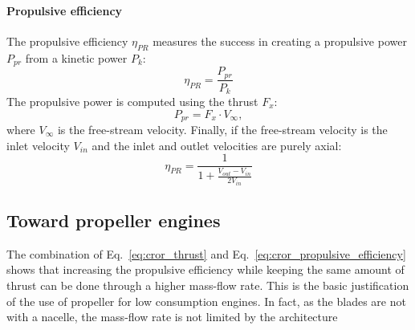 \paragraph{Propulsive efficiency}
The propulsive efficiency $\eta_{PR}$ measures the success
in creating a propulsive power $P_{pr}$ from a
kinetic power $P_k$:
\begin{equation}
	\eta_{PR} = \frac{P_{pr}}{P_k}
\end{equation}
The propulsive power is computed using the thrust $F_x$:
\begin{equation}
	P_{pr} = F_x \cdot V_{\infty},
\end{equation}
where $V_{\infty}$ is the free-stream velocity.
Finally, if the free-stream velocity is the inlet velocity $V_{in}$
and the inlet and outlet velocities are purely axial:
\begin{equation}
	\eta_{PR} = \frac{1}{1 + \frac{V_{out} - V_{in}}{2 V_{in}}}
	\label{eq:cror_propulsive_efficiency}
\end{equation}

\subsection{Toward propeller engines}
\label{sub:cror_toward_propeller}

The combination of Eq.~\eqref{eq:cror_thrust} and 
Eq.~\eqref{eq:cror_propulsive_efficiency} shows that
increasing the propulsive efficiency while keeping the same amount
of thrust can be done through a higher mass-flow rate. This is 
the basic justification of the use of propeller for low consumption engines.
In fact, as the blades are not with a nacelle, the mass-flow rate is not limited
by the architecture